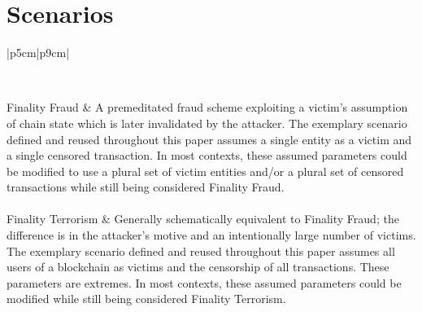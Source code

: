 \documentclass[11pt]{article}
\theoremstyle{plain}
\begin{document}

\section{\normalsize{Scenarios}}\label{sec: scenarios}

\begin{table}[H]
\caption{Abstracts of Referenced Chain State Scenarios \label{table: chainstate-scenarios}}
\centering
\small{
\begin{tabular}{|p{5cm}|p{9cm}|}

\hline
{} \\
\hline
\hline

Finality Fraud & A premeditated fraud scheme exploiting a victim's
assumption of chain state which is later invalidated by the attacker.
The exemplary scenario defined and reused throughout this paper assumes a single
entity as a victim and a single censored transaction.
In most contexts, these assumed parameters could be modified to use a plural set of victim entities
and/or a plural set of censored transactions while still being considered Finality Fraud.
\\~\\

Finality Terrorism & Generally schematically equivalent to Finality
Fraud; the difference is in the attacker's motive and an intentionally large number of victims.
The exemplary scenario defined and reused throughout this paper
assumes all users of a blockchain as victims and the censorship of all transactions.
These parameters are extremes.
In most contexts, these assumed parameters could be modified while still being considered Finality Terrorism.
\\~\\

\hline
\end{tabular}
}
\end{table}


\end{document}
